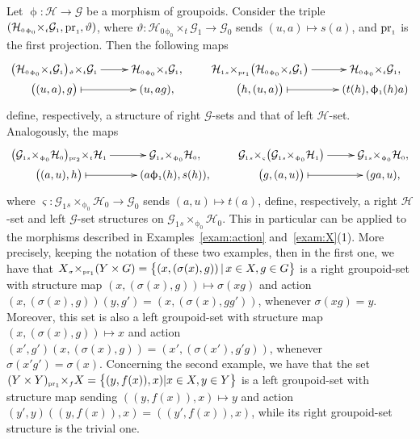 \documentclass[pdftex]{sigma}
\numberwithin{equation}{section}
\newcommand{\Go}{\cG_{\Sscript{0}}}
\newcommand{\Ga}{\cG_{\Sscript{1}}}
\newcommand{\Ho}{\cH_{\Sscript{0}}}
\newcommand{\Ha}{\cH_{\Sscript{1}}}
\newcommand{\cG}{{\mathcal G}}
\newcommand{\cH}{{\mathcal H}}
\newcommand{\Sscript}[1]{\scriptscriptstyle{#1}}
\newcommand{\due}[3]{{}_{{#2 }} {#1}_{{ #3}} }
\newcommand{\phia}{\upphi_{\Sscript{1}}}
\begin{document}
\begin{Example}\label{exam: HG}Let $\upphi\colon \cH \!\to\! \cG$ be a morphism of groupoids. Consider the triple $(\Ho \due \times {\Sscript{\upphi_0}} { \Sscript{t}} \Ga, {\rm pr}_{\Sscript{1}}, \vartheta)$, where $\vartheta\colon \Ho \due \times {\Sscript{\upphi_0}} { \Sscript{t}} \Ga \to \Go$ sends $(u,a) \mapsto s(a)$, and ${\rm pr}_{\Sscript{1}}$ is the first projection. Then the following maps
\begin{gather*}
\xymatrix@R=0pt{ \big(\Ho \due \times {\Sscript{\upphi_0}} { \Sscript{t}} \Ga\big) \due \times {\Sscript{\vartheta}} { \Sscript{t}} \Ga \ar@{->}^-{}[r] & \Ho \due \times {\Sscript{\upphi_0}} { \Sscript{t}} \Ga, \\ \big((u,a),g\big)\ar@{|->}^-{}[r] & (u, ag), } \qquad \xymatrix@R=0pt{ \Ha \due \times {\Sscript{s}} { \Sscript{{\rm pr}_1}} \big(\Ho \due
\times {\Sscript{\upphi_0}} { \Sscript{t}} \Ga\big) \ar@{->}^-{}[r] & \Ho \due \times {\Sscript{\upphi_0}} { \Sscript{t}} \Ga, \\ \big(h, (u,a)\big) \ar@{|->}^-{}[r] & (t(h),\phia(h)a) }
\end{gather*}
define, respectively, a structure of right $\cG$-sets and that of left $\cH$-set. Analogously, the maps
\begin{gather*}
\xymatrix@R=0pt{ \big(\Ga \due \times {\Sscript{s}} { \Sscript{\upphi_0}} \Ho\big) \due \times {\Sscript{{\rm pr}_2}} { \Sscript{t}} \Ha \ar@{->}^-{}[r] & \Ga \due \times
{\Sscript{s}} { \Sscript{\upphi_0}} \Ho, \\ \big((a,u),h \big)\ar@{|->}^-{}[r] & (a\phia(h), s(h)), } \qquad
\xymatrix@R=0pt{ \Ga \due \times {\Sscript{s}} { \Sscript{\varsigma}} \big(\Ga \due \times {\Sscript{s}} { \Sscript{\upphi_0}} \Ha\big) \ar@{->}^-{}[r] & \Ga \due \times
{\Sscript{s}} { \Sscript{\upphi_0}} \Ho, \\ \big(g, (a,u)\big)\ar@{|->}^-{}[r] & (ga,u), }
\end{gather*}
where $\varsigma\colon \Ga \due \times {\Sscript{s}} { \Sscript{\upphi_0}} \Ho \to \Go$ sends $(a,u) \mapsto t(a)$, define, respectively, a right $\cH$-set and left $\cG$-set structures on $\Ga \due \times {\Sscript{s}} { \Sscript{\upphi_0}} \Ho$. This in particular can be applied to the morphisms described in Examples~\ref{exam:action} and~\ref{exam:X}(1). More precisely, keeping the notation of these two examples, then in the first one, we have that $X \due \times {\Sscript{\sigma}} { \Sscript{{\rm pr}_1}} (Y \times G) =\big\{ (x, (\sigma(x),g)) \,|\, x \in X, g \in G \big\} $ is a right groupoid-set with structure map $(x, (\sigma(x),g)) \mapsto \sigma(xg)$ and action $(x, (\sigma(x),g)) (y, g' )= (x, (\sigma(x),gg'))$, whenever $\sigma(xg)=y$. Moreover, this set is also a left groupoid-set with structure map $(x, (\sigma(x),g)) \mapsto x$ and action $(x',g') (x, (\sigma(x),g)) = (x', (\sigma(x'),g'g))$, whenever $\sigma(x'g')=\sigma(x)$. Concerning the second example, we have that the set $(Y\times Y) \due \times {\Sscript{{\rm pr}_1}} { \Sscript{f}} X =\big\{ (y,f(x)),x)| x \in X, y \in Y\big\}$ is a left groupoid-set with structure map sending $((y,f(x)),x) \mapsto y$ and action $(y',y) ((y, f(x)),x) = ((y',f(x)),x)$, while its right groupoid-set structure is the trivial one.

\end{Example}
\end{document}
